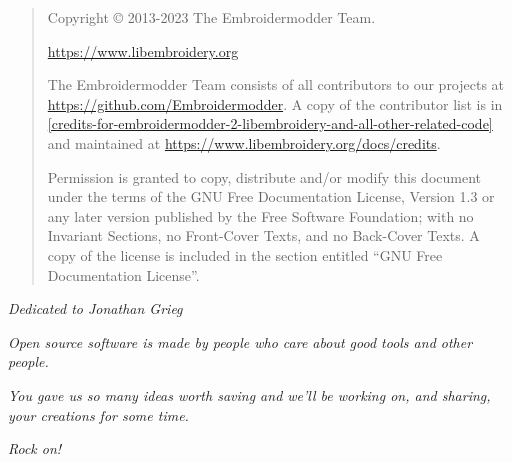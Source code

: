 \vspace*{8cm}

\begin{quote}
Copyright \copyright{} 2013-2023 The Embroidermodder Team.

\url{https://www.libembroidery.org}

The Embroidermodder Team consists of all contributors to our projects
at \url{https://github.com/Embroidermodder}. A copy of the contributor
list is in
\ref{credits-for-embroidermodder-2-libembroidery-and-all-other-related-code}
and maintained at \url{https://www.libembroidery.org/docs/credits}.

\bigskip

Permission is granted to copy, distribute and/or modify this document
under the terms of the GNU Free Documentation License, Version 1.3
or any later version published by the Free Software Foundation;
with no Invariant Sections, no Front-Cover Texts, and no Back-Cover Texts.
A copy of the license is included in the section entitled ``GNU
Free Documentation License''.
\end{quote}

\newpage

\vspace*{8cm}

\begin{center}
    \emph{Dedicated to Jonathan Grieg}
    
    \vspace{1cm}
    
    \emph{Open source software is made by people who care about good tools and other people.}
    
    \vspace{1cm}
    
    \emph{You gave us so many ideas worth saving and we'll be working on, and sharing, your creations for some time.}
    
    \vspace{1cm}
    
    \emph{Rock on!}
\end{center}
    
\newpage

\tableofcontents








\appendix



\printindex


